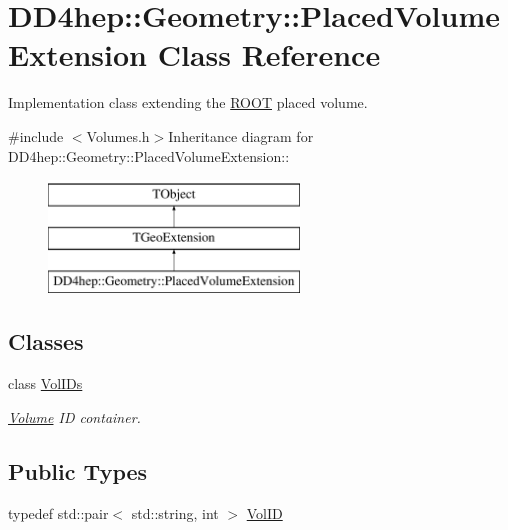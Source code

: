 \hypertarget{class_d_d4hep_1_1_geometry_1_1_placed_volume_extension}{
\section{DD4hep::Geometry::PlacedVolumeExtension Class Reference}
\label{class_d_d4hep_1_1_geometry_1_1_placed_volume_extension}
}


Implementation class extending the \hyperlink{namespace_r_o_o_t}{ROOT} placed volume.  


{\ttfamily \#include $<$Volumes.h$>$}Inheritance diagram for DD4hep::Geometry::PlacedVolumeExtension::\begin{figure}[H]
\begin{center}
\leavevmode
\includegraphics[height=3cm]{class_d_d4hep_1_1_geometry_1_1_placed_volume_extension}
\end{center}
\end{figure}
\subsection*{Classes}
\begin{DoxyCompactItemize}
\item 
class \hyperlink{class_d_d4hep_1_1_geometry_1_1_placed_volume_extension_1_1_vol_i_ds}{VolIDs}
\begin{DoxyCompactList}\small\item\em \hyperlink{class_d_d4hep_1_1_geometry_1_1_volume}{Volume} ID container. \item\end{DoxyCompactList}\end{DoxyCompactItemize}
\subsection*{Public Types}
\begin{DoxyCompactItemize}
\item 
typedef std::pair$<$ std::string, int $>$ \hyperlink{class_d_d4hep_1_1_geometry_1_1_placed_volume_extension_a9f0e95dedfbda206b118af985b2ed473}{VolID}
\end{DoxyCompactItemize}
